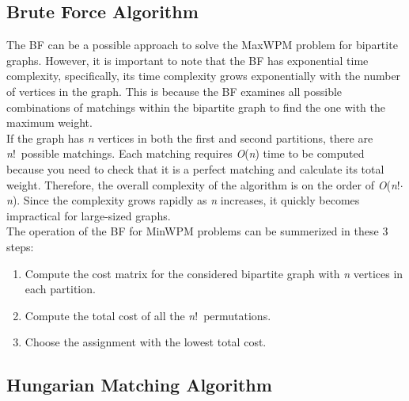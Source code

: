 \subsection{Brute Force Algorithm}
\label{sec:bf}
The BF can be a possible approach to solve the MaxWPM problem for bipartite graphs.
However, it is important to note that the BF has exponential time complexity, specifically, its time complexity grows exponentially with the number of vertices in the graph.
This is because the BF examines all possible combinations of matchings within the bipartite graph to find the one with the maximum weight.\\
If the graph has \textit{n} vertices in both the first and second partitions, there are \textit{n}!\ possible matchings.
Each matching requires \textit{O}(\textit{n}) time to be computed because you need to check that it is a perfect matching and calculate its total weight.
Therefore, the overall complexity of the algorithm is on the order of \textit{O}(\textit{n}!$\cdot$\textit{n}).
Since the complexity grows rapidly as \textit{n} increases, it quickly becomes impractical for large-sized graphs. \\
The operation of the BF for MinWPM problems can be summerized in these 3 steps:
\begin{enumerate}
    \item {Compute the cost matrix for the considered bipartite graph with \textit{n} vertices in each partition.}
    \item {Compute the total cost of all the \textit{n}!\ permutations.}
    \item {Choose the assignment with the lowest total cost.}
\end{enumerate}


\subsection{Hungarian Matching Algorithm}
\label{sec:ha}

